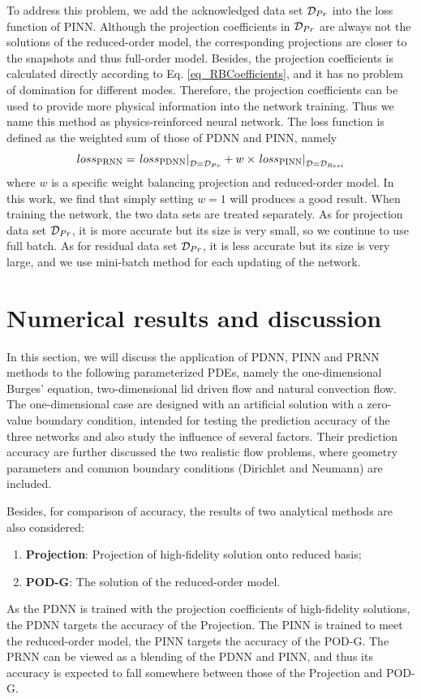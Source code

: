 \documentclass[preprint, 10pt]{elsarticle}
\begin{document}
To address this problem, we add the acknowledged data set ${\cal {D}}_{Pr}$ into the loss function of PINN. Although the projection coefficients in ${\cal {D}}_{Pr}$  are always not the solutions of the reduced-order model, the corresponding projections are closer to the snapshots and thus full-order model. Besides, the projection coefficients is calculated directly according to Eq. \ref{eq_RBCoefficients}, and it has no problem of domination for different modes. Therefore, the projection coefficients can be used to provide more physical information into the network training. Thus we name this method as physics-reinforced neural network. The loss function is defined as the weighted sum of those of PDNN and PINN, namely
\begin{equation}
{loss}_{\rm{PRNN}} =
\left. {{loss}_{\rm{PDNN}}} \right|_{{\cal{D}} = {\cal {D}}_{Pr} }
+
w \times \left. {{loss}_{\rm{PINN}}} \right|_{{\cal D} = {\cal D}_{Resi }}
\label{eq_lossPRNN}
\end{equation}
where $w$ is a specific weight balancing projection and reduced-order model. In this work, we find that simply setting $w=1$ will produces a good result.  When training the network, the two data sets are treated separately. As for projection data set ${\cal D}_{Pr}$, it is more accurate but its size is very small, so we continue to use full batch. As for residual data set ${\cal D}_{Pr}$, it is less accurate but its size is very large, and we use mini-batch method for each updating of the network.

\section{Numerical results and discussion}
In this section,
we will discuss the application of PDNN, PINN and PRNN methods to the following parameterized PDEs, namely the one-dimensional Burges' equation, two-dimensional lid driven flow and natural convection flow.
The one-dimensional case are designed with an artificial solution with a zero-value boundary condition, intended for testing the prediction accuracy of the three networks and also study the influence of several factors. Their prediction accuracy are further discussed the two realistic flow problems, where geometry parameters and common boundary conditions (Dirichlet and Neumann) are included.

Besides, for comparison of accuracy, the results of two analytical methods are also considered:
\begin{enumerate}[(1)]
\item \textbf{Projection}: Projection of high-fidelity solution onto reduced basis;
\item \textbf{POD-G}: The solution of the reduced-order model.
\end{enumerate}
As the PDNN is trained with the projection coefficients of high-fidelity solutions, the PDNN targets the accuracy of the Projection. The PINN is trained to meet the reduced-order model, the PINN targets the accuracy of the POD-G. The PRNN can be viewed as a blending of the PDNN and PINN, and thus its accuracy is expected to fall somewhere between those of the Projection and POD-G.
\end{document}
